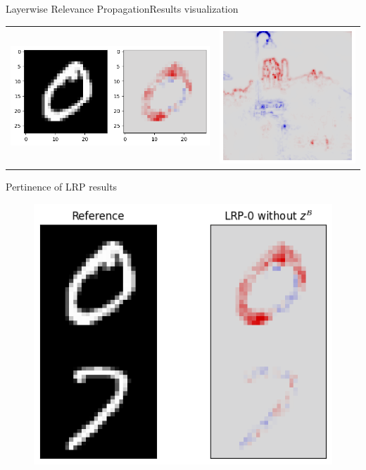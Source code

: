 \documentclass[aspectratio=169]{beamer}
\theoremstyle{definition}
\begin{document}
\begin{frame}{Layerwise Relevance Propagation}{Results visualization}
    \begin{tabular}[pos]{cc}
        \includegraphics[width=.4\textwidth]{mnist-lrp.png}
        &
        \includegraphics[width=.4\textwidth]{castle-lrp.png}
    \end{tabular}
\end{frame}

\begin{frame}{Pertinence of LRP results}
    \begin{figure}[H]
        \includegraphics[width=.5\textwidth]{dmnist-lrp.png}
    \end{figure}
\end{frame}
\end{document}
